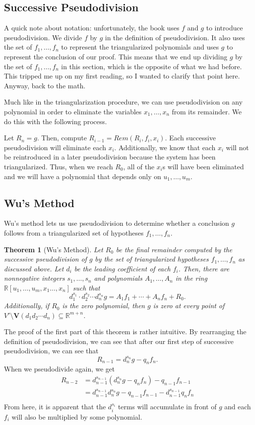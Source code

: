 \documentclass{article}
\theoremstyle{plain}
\newtheorem{Theorem}{Theorem}
\theoremstyle{definition}
\theoremstyle{remark}
\begin{document}
\subsection{Successive Pseudodivision}

A quick note about notation: unfortunately, the book uses $f$ and $g$ to introduce pseudodivision. We divide $f$ by $g$ in the definition of pseudodivision.
It also uses the set of $f_1,\dots,f_n$ to represent the triangularized polynomials and uses $g$ to represent the conclusion of our proof.
This means that we end up dividing $g$ by the set of $f_1,\dots,f_n$ in this section, which is the opposite of what we had before. 
This tripped me up on my first reading, so I wanted to clarify that point here. Anyway, back to the math.

Much like in the triangularization procedure, we can use pseudodivision on any polynomial in order to eliminate the variables $x_1,\dots,x_n$ from its remainder.
We do this with the following process.

Let $R_n = g$. Then, compute $R_{i-1} = Rem(R_i,f_i,x_i)$. Each successive pseudodivision will eliminate each $x_i$. 
Additionally, we know that each $x_i$ will not be reintroduced in a later pseudodivision because the system has been triangularized.
Thus, when we reach $R_0$, all of the $x_i$s will have been eliminated and we will have a polynomial that depends only on $u_1,\dots,u_m$.


\subsection{Wu's Method}
Wu's method lets us use pseudodivision to determine whether a conclusion $g$ follows from a triangularized set of hypotheses $f_1,\dots,f_n$.
\begin{Theorem}[Wu's Method]
    Let $R_0$ be the final remainder computed by the successive pseudodivision of $g$ by the set of triangularized hypotheses $f_1,\dots,f_n$ as discussed above.
    Let $d_i$ be the leading coefficient of each $f_i$. 
    Then, there are nonnegative integers $s_1,\dots,s_n$ and polynomials $A_1,\dots,A_n$ in the ring $\mathbb{R}[u_1,\dots,u_m,x_1\dots,x_n]$ such that
    $$d_{1}^{s_1}\cdot d_2^{s_2} \cdots d_n^{s_n} g = A_1 f_1 + \cdots + A_n f_n + R_0.$$
    Additionally, if $R_0$ is the zero polynomial, then $g$ is zero at every point of $V' \setminus \textbf{V}(d_1d_2\cdots d_n) \subseteq \mathbb{R}^{m+n}$.
\end{Theorem}
The proof of the first part of this theorem is rather intuitive. 
By rearranging the definition of pseudodivision, we can see that after our first step of successive pseudodivision, we can see that $$R_{n-1} = d_n^{s_n} g - q_nf_n.$$
When we pseudodivide again, we get
\begin{align*}
    R_{n-2} & = d_{n-1}^{s_{n-1}}(d_n^{s_n} g - q_nf_n) - q_{n-1}f_{n-1}\\
            & = d_{n-1}^{s_{n-1}}d_n^{s_n} g - q_{n-1}f_{n-1} - d_{n-1}^{s_{n-1}}q_nf_n \\
\end{align*}
From here, it is apparent that the $d_i^{s_i}$ terms will accumulate in front of $g$ and each $f_i$ will also be multiplied by some polynomial.
\end{document}
